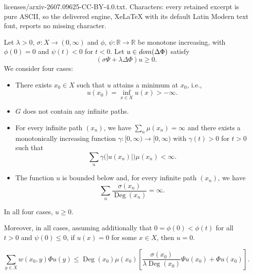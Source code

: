 \documentclass[10pt,a4paper]{amsart}
\newcommand{\Deg}{\operatorname{Deg}}
\newcommand{\R}{\mathbb{R}}
\newcommand{\dom}{\textnormal{dom}} %
\begin{document}
licenses/arxiv-2607.09625-CC-BY-4.0.txt. Characters: every retained excerpt is pure ASCII, so the delivered engine, XeLaTeX with its default Latin Modern text font, reports no missing character.
\begin{theorem}\label{thm:min_principle}
Let $\lambda>0$, $\sigma \colon X \to (0, \infty)$ and $\phi, \,\psi \colon \R \to \R$ be monotone increasing, with
$\phi(0)=0$ and $\psi(t)<0$ for $t<0$.
Let $u \in \dom(\Delta \Phi)$ satisfy 
$$\left( \sigma \Psi + \lambda\Delta \Phi\right)u \geq 0.$$ 
We consider four cases:

\begin{itemize}
	\item[\emph{\textbf{Case 1:}}]
	There exists $x_0 \in X$ such that $u$ attains a minimum at $x_0$, i.e.,
	$$u(x_{0})=\inf_{x\in X} u(x) > -\infty.$$
	
	\item[\emph{\textbf{Case 2:}}] $G$ does not contain any infinite paths. 	

    \item[\emph{\textbf{Case 3:}}] For every infinite path $(x_{n})$, we have $\sum_{n} \mu(x_{n})=\infty$ and there exists  a monotonically increasing  function $\gamma \colon [0,\infty) \to [0,\infty)$ with  $\gamma(t)>0$ for $t>0$ such  that 
    $$
    \sum_{n}\gamma \bigl( |u(x_{n})| \bigr) \mu(x_{n})<\infty .
    $$
  \item[\emph{\textbf{Case 4:}}] The function $u$ is bounded below 
  and, for every infinite path $(x_{n})$, we have 
    $$\sum_{n} \frac{\sigma(x_n)}{\Deg(x_{n})}=\infty.$$
\end{itemize}    
	 In all four cases, $u \geq 0$. 
     
     Moreover, in all cases,
     { assuming additionally that $0=\phi(0)<\phi(t)$ for all $t>0$ and $\psi(0)\leq 0$}, if $u(x)=0$ for some $x\in X$, then  $u= 0$. 
\end{theorem}

\begin{equation}\label{eq:ineq_1}
\sum_{y \in X} w(x_0,y) \Phi u(y) \leq { \Deg(x_0)\mu(x_0)
\left[\frac{\sigma(x_0)}{\lambda \Deg(x_0)} \Psi u(x_0) +  \Phi u(x_0) \right].}
\end{equation}
\end{document}

